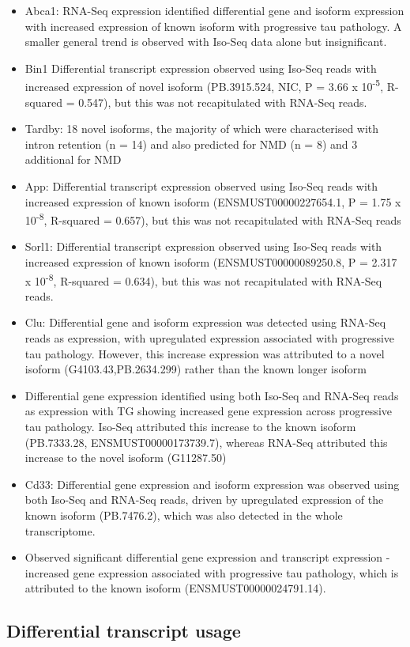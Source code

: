 \begin{itemize}
	\item Abca1: RNA-Seq expression identified differential gene and isoform expression with increased expression of known isoform with progressive tau pathology. A smaller general trend is observed with Iso-Seq data alone but insignificant.
	\item Bin1 Differential transcript expression observed using Iso-Seq reads with increased expression of novel isoform (PB.3915.524, NIC, P = 3.66 x 10\textsuperscript{-5}, R-squared = 0.547), but this was not recapitulated with RNA-Seq reads.
	\item Tardby: 18 novel isoforms, the majority of which were characterised with intron retention (n = 14) and also predicted for NMD (n = 8) and 3 additional for NMD
	\item App: Differential transcript expression observed using Iso-Seq reads with increased expression of known isoform (ENSMUST00000227654.1, P = 1.75 x 10\textsuperscript{-8}, R-squared = 0.657), but this was not recapitulated with RNA-Seq reads
	\item Sorl1: Differential transcript expression observed using Iso-Seq reads with increased expression of known isoform (ENSMUST00000089250.8, P = 2.317 x 10\textsuperscript{-8}, R-squared = 0.634), but this was not recapitulated with RNA-Seq reads.
	\item Clu: Differential gene and isoform expression was detected using RNA-Seq reads as expression, with upregulated expression associated with progressive tau pathology. However, this increase expression was attributed to a novel isoform (G4103.43,PB.2634.299) rather than the known longer isoform
	\item Differential gene expression identified using both Iso-Seq and RNA-Seq reads as expression with TG showing increased gene expression across progressive tau pathology. Iso-Seq attributed this increase to the known isoform (PB.7333.28, ENSMUST00000173739.7), whereas RNA-Seq attributed this increase to the novel isoform (G11287.50)
	\item Cd33: Differential gene expression and isoform expression was observed using both Iso-Seq and RNA-Seq reads, driven by upregulated expression of the known isoform (PB.7476.2), which was also detected in the whole transcriptome. 
	\item Observed significant differential gene expression and transcript expression - increased gene expression associated with progressive tau pathology, which is attributed to the known isoform (ENSMUST00000024791.14).
\end{itemize}

\subsection{Differential transcript usage}

